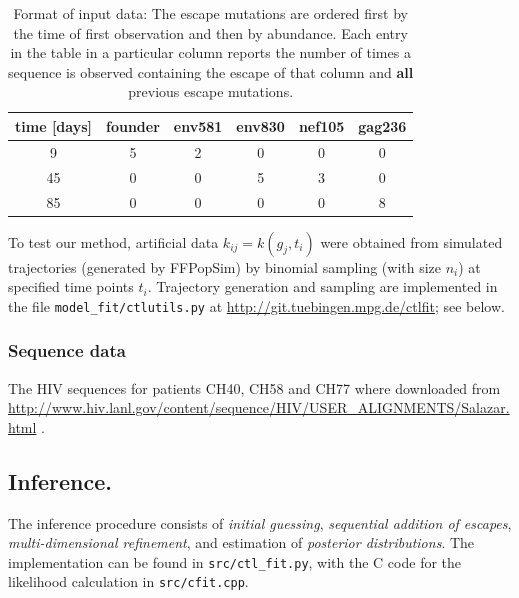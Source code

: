 \documentclass{frontiers}
\newcommand{\gt}{g}
\begin{document}
\begin{table}
  \centering
  \begin{tabular}{|c|c|c|c|c|c|}
\hline
 time [days] & founder & 	env581 &	env830&	nef105&	gag236 \\ \hline
9	&5	&2	&0	&0	&0\\
45	&0	&0	&5	&3	&0\\
85	&0	&0	&0	&0	&8\\ \hline
  \end{tabular}
  \caption{Format of input data: The escape mutations are ordered
    first by the time of first observation and then by abundance. Each entry in the table
    in a particular column reports the number of times a sequence is
    observed containing the escape of that column and {\bf all}
    previous escape mutations. }
\label{tab:data_example}
\end{table}

To test our method,
artificial data $k_{ij} = k(\gt_j,t_i)$ were obtained from simulated
trajectories (generated by FFPopSim) by binomial sampling (with size $n_{i}$) at specified
time points $t_i$. Trajectory generation and sampling are implemented in the file
\texttt{model\_fit/ctlutils.py} at \url{http://git.tuebingen.mpg.de/ctlfit}; see below.

\subsubsection{Sequence data}
The HIV sequences for patients CH40, CH58 and CH77 where downloaded from
\url{http://www.hiv.lanl.gov/content/sequence/HIV/USER_ALIGNMENTS/Salazar.html}
\citep{SalazarGonzalez:2009p35091}. 

\subsection{Inference.} 
The inference procedure consists of \emph{initial guessing}, \emph{sequential
addition of escapes}, \emph{multi-dimensional refinement}, and estimation of
\emph{posterior distributions}. The implementation can be found in
\texttt{src/ctl\_fit.py}, with the C code for the likelihood calculation in
\texttt{src/cfit.cpp}.
\end{document}
